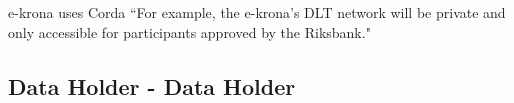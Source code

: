 \documentclass[runningheads]{llncs}
\begin{document}
e-krona uses Corda ``For example, the e-krona’s DLT network will be private and only accessible for participants
approved by the Riksbank."~\cite{KRONA}

\subsection{Data Holder - Data Holder}


\end{document}
